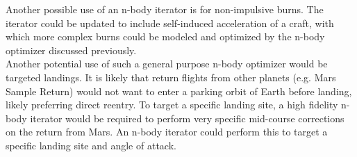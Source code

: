 \documentclass[conference]{IEEEtran}
\begin{document}
	Another possible use of an n-body iterator is for non-impulsive burns. The iterator could be updated to include self-induced acceleration of a craft, with which more complex burns could be modeled and optimized by the n-body optimizer discussed previously.\\
	
	Another potential use of such a general purpose n-body optimizer would be targeted landings. It is likely that return flights from other planets (e.g. Mars Sample Return) would not want to enter a parking orbit of Earth before landing, likely preferring direct reentry. To target a specific landing site, a high fidelity n-body iterator would be required to perform very specific mid-course corrections on the return from Mars. An n-body iterator could perform this to target a specific landing site and angle of attack.
	
	\newpage
	
\end{document}
